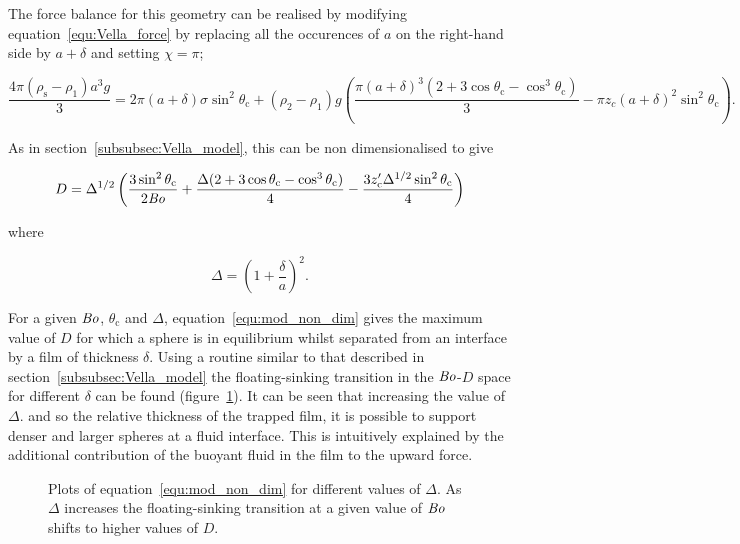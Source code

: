 \documentclass[12pt]{article}
\newcommand\Bo{\mbox{\textit{Bo}}}  %
\begin{document}
The force balance for this geometry can be realised by modifying equation~\ref{equ:Vella_force} by replacing all the occurences of $a$ on the right-hand side by $a + \delta$ and setting $\chi = \pi$;

\begin{equation}
\label{equ:mod_force}
\frac{4 \pi (\rho_{\text{s}} - \rho_{1}) a^{3} g}{3} = 2 \pi (a + \delta) \sigma \sin^{2} \theta_{\text{c}} + (\rho_{2} - \rho_{1}) g \left(\frac{\pi (a + \delta)^{3} (2 + 3 \cos \theta_{\text{c}} - \cos^{3} \theta_{\text{c}})}{3} - \pi z_{c} (a + \delta)^{2} \sin^{2} \theta_{\text{c}} \right).
\end{equation}

As in section~\ref{subsubsec:Vella_model}, this can be non dimensionalised to give

\begin{equation}
\label{equ:mod_non_dim}
D = \Delta^{1/2} \left(\frac{3 \sin^{2} \theta_{\text{c}}}{2 \Bo} + \frac{\Delta (2 + 3 \cos \theta_{\text{c}} - \cos^{3} \theta_{\text{c}})}{4} - \frac{3 z'_{\text{c}} \Delta^{1/2} \sin^{2} \theta_{\text{c}}}{4}\right)
\end{equation}

where

\begin{equation}
\label{equ:non_dim_film}
\Delta = \left(1 + \frac{\delta}{a}\right)^{2}.
\end{equation}

For a given $\Bo$, $\theta_{\text{c}}$ and $\Delta$, equation~\ref{equ:mod_non_dim} gives the maximum value of $D$ for which a sphere is in equilibrium whilst separated from an interface by a film of thickness $\delta$. Using a routine similar to that described in section~\ref{subsubsec:Vella_model} the floating-sinking transition in the $\Bo$-$D$ space for different $\delta$ can be found (figure~\ref{fig:Delta_trans}). It can be seen that increasing the value of $\Delta$. and so the relative thickness of the trapped film, it is possible to support denser and larger spheres at a fluid interface. This is intuitively explained by the additional contribution of the buoyant fluid in the film to the upward force.

  \begin{figure}
    \resizebox{0.9\textwidth}{!}{\large }
    \caption{Plots of equation~\ref{equ:mod_non_dim} for different values of $\Delta$. As $\Delta$ increases the floating-sinking transition at a given value of $\Bo$ shifts to higher values of $D$. \label{fig:Delta_trans}}
  \end{figure}
\end{document}
